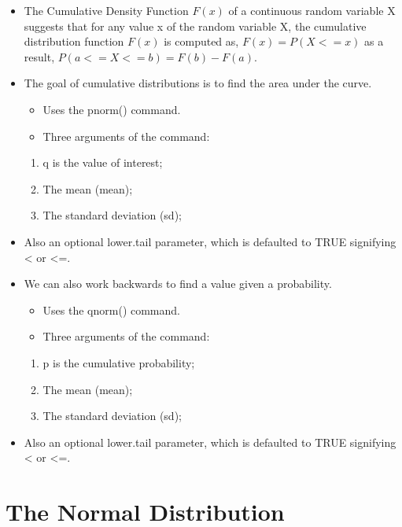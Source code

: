 \documentclass[
  letterpaper,
  DIV=11,
  numbers=noendperiod]{scrreprt}
\providecommand{\tightlist}{%
  \setlength{\itemsep}{0pt}\setlength{\parskip}{0pt}}\usepackage{longtable,booktabs,array}
\begin{document}
\begin{itemize}
\item
  The Cumulative Density Function \(F(x)\) of a continuous random
  variable X suggests that for any value x of the random variable X, the
  cumulative distribution function \(F(x)\) is computed as,
  \(F(x) = P(X <= x)\) as a result, \(P(a<=X<=b) = F(b)- F(a)\).
\item
  The goal of cumulative distributions is to find the area under the
  curve.

  \begin{itemize}
  \tightlist
  \item
    Uses the pnorm() command.
  \item
    Three arguments of the command:
  \end{itemize}

  \begin{enumerate}
  \def\labelenumi{\arabic{enumi}.}
  \tightlist
  \item
    q is the value of interest;
  \item
    The mean (mean);
  \item
    The standard deviation (sd);
  \end{enumerate}
\item
  Also an optional lower.tail parameter, which is defaulted to TRUE
  signifying \textless{} or \textless=.
\item
  We can also work backwards to find a value given a probability.

  \begin{itemize}
  \tightlist
  \item
    Uses the qnorm() command.
  \item
    Three arguments of the command:
  \end{itemize}

  \begin{enumerate}
  \def\labelenumi{\arabic{enumi}.}
  \tightlist
  \item
    p is the cumulative probability;
  \item
    The mean (mean);
  \item
    The standard deviation (sd);
  \end{enumerate}
\item
  Also an optional lower.tail parameter, which is defaulted to TRUE
  signifying \textless{} or \textless=.
\end{itemize}

\section{The Normal Distribution}\label{the-normal-distribution}
\end{document}
